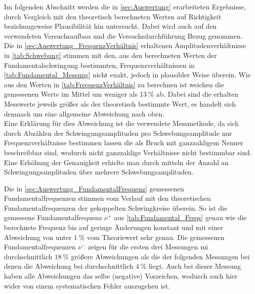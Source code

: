 Im folgenden Abschnitt werden die in \cref{sec:Auswertung} erarbeiteten Ergebnisse,
durch Vergleich mit den theoretisch berechneten Werten auf Richtigkeit beziehungsweise
Plausibilität hin untersucht. Dabei wird auch auf den verwendeten Versuchsaufbau und die 
Versuchsdurchführung Bezug genommen.\\

Die in \cref{sec:Auswertung_FrequenzVerhältnis} erhaltenen Amplitudenverhältnisse in \cref{tab:Schwebung} 
stimmen mit den, aus den berechneten Werten der Fundamentalschwingung bestimmten, Frequenzverhältnissen
in \cref{tab:Fundamental_Messung} nicht exakt, jedoch in plausibler Weise überein. Wie aus den Werten in 
\cref{tab:FrequenzVerhältnis} zu berechnen ist weichen die gemessenen Werte im Mittel um weniger als
$\SI{13}{\percent}$ ab. Dabei sind die erhalten Messwerte jeweils größer als der theoretisch bestimmte 
Wert, es handelt sich demnach um eine allgemeine Abweichung nach oben.\\
Eine Erklärung für dies Abweichung ist die verwendete Messmethode, da sich durch Abzählen der Schwingungsamplituden
pro Schwebungsamplitude nur Frequenzverhältnisse bestimmen lassen die als Bruch mit ganzzahligem Nenner beschreibbar
sind, wodurch nicht ganzzahlige Verhältnisse nicht bestimmbar sind. Eine Erhöhung der Genauigkeit erhielte man durch 
mitteln der Anzahl an Schwingungsamplituden über mehrere Schwebungsamplituden.   
     
Die in \cref{sec:Auswertung_FundamentalFrequenz} gemessenen Fundamentalfrequenzen stimmen vom Verlauf mit den 
theoretischen Fundamentalfrequenzen der gekoppelten Schwingkreise überein. So ist die gemessene Fundamentalfrequenz
$\nu^{+}$  aus \cref{tab:Fundamental_Freqs} genau wie die berechnete Frequenz bis auf geringe Änderungen 
konstant und mit einer Abweichung von unter $\SI{1}{\percent}$ vom Theoriewert sehr genau. 
Die gemessenen Fundamentalfrequenzen $\nu^{-}$ zeigen für die ersten drei Messungen mi durchschnittlich $\SI{18}{\percent}$
größere Abweichungen als die der folgenden Messungen bei denen die Abweichung bei durchschnittlich $\SI{4}{\percent}$
liegt. Auch bei dieser Messung haben alle Abweichungen das selbe (negative) Vorzeichen, wodurch auch hier wider
von einem systematischen Fehler auszugehen ist.
